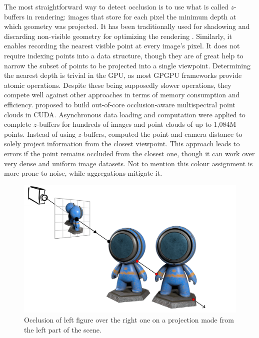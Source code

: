 The most straightforward way to detect occlusion is to use what is called $z$-buffers in rendering: images that store for each pixel the minimum depth at which geometry was projected. It has been traditionally used for shadowing and discarding non-visible geometry for optimizing the rendering \cite{akenine-moller_real-time_2018, white_cascaded_2021}. Similarly, it enables recording the nearest visible point at every image's pixel. It does not require indexing points into a data structure, though they are of great help to narrow the subset of points to be projected into a single viewpoint. Determining the nearest depth is trivial in the GPU, as most GPGPU frameworks provide atomic operations. Despite these being supposedly slower operations, they compete well against other approaches in terms of memory consumption and efficiency. \cite{jurado_out--core_2022} proposed to build out-of-core occlusion-aware multispectral point clouds in CUDA. Asynchronous data loading and computation were applied to complete $z$-buffers for hundreds of images and point clouds of up to 1,084M points. Instead of using $z$-buffers, \cite{jo_dense_2021} computed the point and camera distance to solely project information from the closest viewpoint. This approach leads to errors if the point remains occluded from the closest one, though it can work over very dense and uniform image datasets. Not to mention this colour assignment is more prone to noise, while aggregations mitigate it. 

\begin{figure}[!ht]
	\includegraphics[width=\textwidth]{figs/fundamentals/occlusion.png}
	\caption{Occlusion of left figure over the right one on a projection made from the left part of the scene. }
    \label{fig:occlusion_concept}
\end{figure}

